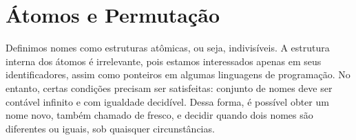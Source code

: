 

\section{Átomos e Permutação}\label{sec:atomos-permutacao}
Definimos nomes como estruturas atômicas, ou seja, indivisíveis. A estrutura interna dos átomos é irrelevante, pois estamos interessados apenas em seus identificadores, assim como ponteiros em algumas linguagens de programação. No entanto, certas condições precisam ser satisfeitas: conjunto de nomes deve ser contável infinito %
e com igualdade decidível. Dessa forma, é possível obter um nome novo, também chamado de fresco, e decidir quando dois nomes são diferentes ou iguais, sob quaisquer circunstâncias.

